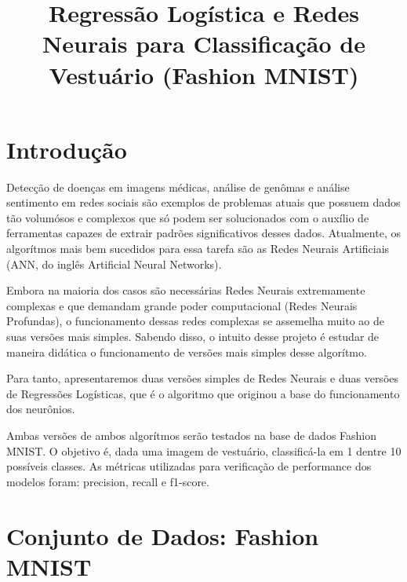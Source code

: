 \documentclass[conference]{IEEEtran}
\begin{document}
\renewcommand{\figurename}{Fig.}
\renewcommand{\refname}{Referências}

\title{Regressão Logística e Redes Neurais para Classificação de Vestuário (Fashion MNIST)}

\author{
\and
{}
}

\maketitle

\section{Introdução}	
	Detecção de doenças em imagens médicas, análise de genômas e análise sentimento em redes sociais são exemplos de problemas atuais que possuem dados tão volumósos e complexos que só podem ser solucionados com o auxílio de ferramentas capazes de extrair padrões significativos desses dados. Atualmente, os algorítmos mais bem sucedidos para essa tarefa são as Redes Neurais Artificiais (ANN, do inglês Artificial Neural Networks).
	
	Embora na maioria dos casos são necessárias Redes Neurais extremamente complexas e que demandam grande poder computacional (Redes Neurais Profundas), o funcionamento dessas redes complexas se assemelha muito ao de suas versões mais simples. Sabendo disso, o intuito desse projeto é estudar de maneira didática o funcionamento de versões mais simples desse algorítmo.
	
	Para tanto, apresentaremos duas versões simples de Redes Neurais e duas versões de Regressões Logísticas, que é o algoritmo que originou a base do funcionamento dos neurônios.
	
	Ambas versões de ambos algorítmos serão testados na base de dados Fashion MNIST. O objetivo é, dada uma imagem de vestuário, classificá-la em 1 dentre 10 possíveis classes. As métricas utilizadas para verificação de performance dos modelos foram: precision, recall e f1-score.
	
\section{Conjunto de Dados: Fashion MNIST}
\end{document}
